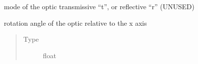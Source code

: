 \documentclass[letterpaper,10pt,english]{sphinxmanual}
\begin{document}
\begin{fulllineitems}

\begin{fulllineitems}
\label{\detokenize{index:pyopticaltable.OpticalElement.mode}}
\sphinxAtStartPar
mode of the optic \sphinxhyphen{} transmissive “t”, or reflective “r” (UNUSED)

\end{fulllineitems}


\begin{fulllineitems}
\label{\detokenize{index:pyopticaltable.OpticalElement.angle}}
\sphinxAtStartPar
rotation angle of the optic relative to the x axis
\begin{quote}\begin{description}
\item[{Type}] \leavevmode
\sphinxAtStartPar
float

\end{description}\end{quote}

\end{fulllineitems}


\end{fulllineitems}

\end{document}
